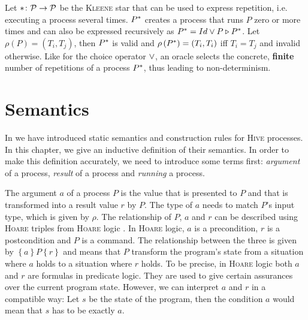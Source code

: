 \begin{definition}
\label{def:static_kleene}
Let $* \colon \mathcal{P} \to \mathcal{P}$ be the \textsc{Kleene} star that can be used to express repetition, i.e. executing a process several times. $P^*$ creates a process that runs $P$ zero or more times and can also be expressed recursively as $P^* = Id \vee P \triangleright P^*$. Let $\rho \left( P \right) = \left( T_i, T_j \right)$, then $P^*$ is valid and $\rho \left( P^* \right) = \left( T_i, T_i \right)$ iff $T_i = T_j$ and invalid otherwise. Like for the choice operator $\vee$, an oracle selects the concrete, \textbf{finite} number of repetitions of a process $P^*$, thus leading to non-determinism.

\hfill\qedsymbol
\end{definition}




\section{Semantics}
\label{chp:semantics}
In  we have introduced static semantics and construction rules for \textsc{Hive} processes. In this chapter, we give an inductive definition of their semantics. In order to make this definition accurately, we need to introduce some terms first: \textit{argument} of a process, \textit{result} of a process and \textit{running} a process.

The argument $a$ of a process $P$ is the value that is presented to $P$ and that is transformed into a result value $r$ by $P$. The type of $a$ needs to match $P$'s input type, which is given by $\rho$. The relationship of $P$, $a$ and $r$ can be described using \textsc{Hoare} triples from \textsc{Hoare} logic \cite{}. In \textsc{Hoare} logic, $a$ is a precondition, $r$ is a postcondition and $P$ is a command. The relationship between the three is given by $\left\{ a \right\} P \left\{ r \right\}$ and means that $P$ transform the program's state from a situation where $a$ holds to a situation where $r$ holds. To be precise, in \textsc{Hoare} logic both $a$ and $r$ are formulas in predicate logic. They are used to give certain assurances over the current program state. However, we can interpret $a$ and $r$ in a compatible way: Let $s$ be the state of the program, then the condition $a$ would mean that $s$ has to be exactly $a$.

